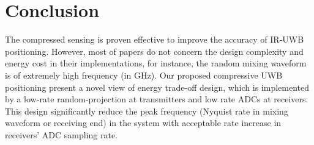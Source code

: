 \section{Conclusion}\label{sct:cs_uwb_conclusion}

\indent \indent The compressed sensing is proven effective to improve the accuracy of IR-UWB positioning. However, most of papers do not concern the design complexity and energy cost in their implementations, for instance, the random mixing waveform is of extremely high frequency (in GHz). Our proposed compressive UWB positioning present a novel view of energy trade-off design, which is implemented by a low-rate random-projection at transmitters and low rate ADCs at receivers. This design significantly reduce the peak frequency (Nyquist rate in mixing waveform or receiving end) in the system with acceptable rate increase in receivers' ADC sampling rate. 





